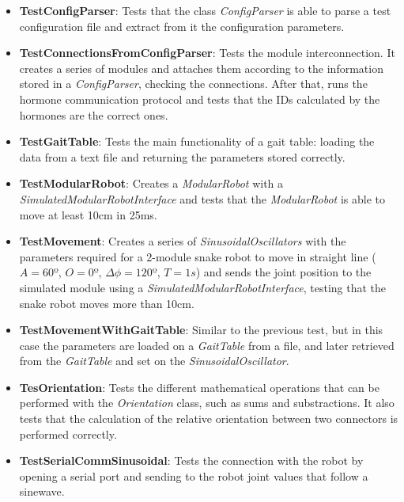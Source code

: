 \begin{itemize}
	\item \textbf{TestConfigParser}: Tests that the class \emph{ConfigParser} is able to parse a test configuration file and extract from it the configuration parameters.
	
	\item \textbf{TestConnectionsFromConfigParser}: Tests the module interconnection. It creates a series of modules and attaches them according to the information stored in a \emph{ConfigParser}, checking the connections. After that, runs the hormone communication protocol and tests that the IDs calculated by the hormones are the correct ones.
	
	\item \textbf{TestGaitTable}: Tests the main functionality of a gait table: loading the data from a text file and returning the parameters stored correctly.
	
	\item \textbf{TestModularRobot}: Creates a \emph{ModularRobot} with a \emph{SimulatedModularRobotInterface} and tests that the \emph{ModularRobot} is able to move at least 10cm in 25ms.
	
	\item \textbf{TestMovement}: Creates a series of \emph{SinusoidalOscillators} with the parameters required for a 2-module snake robot to move in straight line ($A = 60º$, $O = 0º$, $\Delta\phi = 120º$, $T = 1s$) and sends the joint position to the simulated module using a \emph{SimulatedModularRobotInterface}, testing that the snake robot moves more than 10cm.
	
	\item \textbf{TestMovementWithGaitTable}: Similar to the previous test, but in this case the parameters are loaded on a \emph{GaitTable} from a file, and later retrieved from the \emph{GaitTable} and set on the \emph{SinusoidalOscillator}.
	
	\item \textbf{TesOrientation}: Tests the different mathematical operations that can be performed with the \emph{Orientation} class, such as sums and substractions. It also tests that the calculation of the relative orientation between two connectors is performed correctly.	
	
	\item \textbf{TestSerialCommSinusoidal}: Tests the connection with the robot by opening a serial port and sending to the robot joint values that follow a sinewave.
	

\end{itemize}

